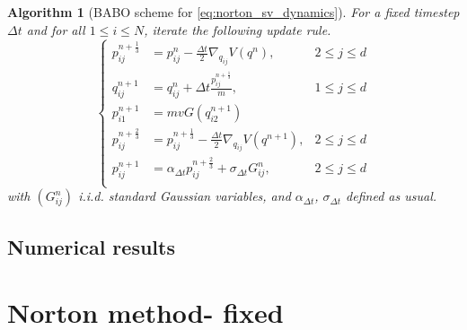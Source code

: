 \documentclass[a4paper,10pt,twoside,leqno]{report}
\newtheorem{algorithm}{Algorithm}
\renewcommand{\leq}{\leqslant}
\newcommand{\1}{\mathbbm{1}}
\newcommand{\Dt}{{\Delta t}}
\newcommand{\iid}{{\textit{i.i.d.} }}
\begin{document}
    \begin{algorithm}[BABO scheme for \eqref{eq:norton_sv_dynamics}]
        For a fixed timestep $\Dt$ and for all $1\leq i\leq N$, iterate the following update rule.
        \begin{equation}
            \left\{
                \begin{aligned}
                    p_{ij}^{n+\frac13}&=p_{ij}^n-\frac{\Dt}2\nabla_{q_{ij}}V(q^n),&2\leq j\leq d \\
                    q_{ij}^{n+1}&=q_{ij}^n+\Dt \frac{p_{ij}^{n+\frac13}}{m},&1\leq j\leq d \\
                    p_{i1}^{n+1}&=mvG(q_{i2}^{n+1})\\
                    p_{ij}^{n+\frac23}&=p_{ij}^{n+\frac13}-\frac{\Dt}2\nabla_{q_{ij}}V(q^{n+1}),&2\leq j\leq d \\
                    p_{ij}^{n+1}&=\alpha_{\Dt}p_{ij}^{n+\frac23}+\sigma_{\Dt}G_{ij}^n,&2\leq j\leq d\\
                \end{aligned}
            \right.
        \end{equation}
        with $(G_{ij}^n)$ \iid standard Gaussian variables, and $\alpha_{\Dt}$, $\sigma_{\Dt}$ defined as usual.
    \end{algorithm}
    
    \subsection{Numerical results}
    
    \section{Norton method- fixed}
\end{document}
